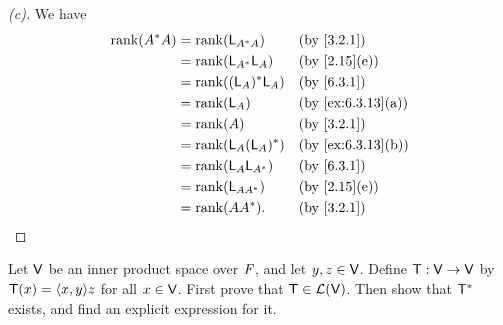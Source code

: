 \begin{proof}[(c)]
  We have
  \begin{align*}
    \rk{A^* A} & = \rk{\L_{A^* A}}    &  & \text{(by \cref{3.2.1})}        \\
               & = \rk{\L_{A^*} \L_A} &  & \text{(by \cref{2.15}(e))}      \\
               & = \rk{(\L_A)^* \L_A} &  & \text{(by \cref{6.3.1})}        \\
               & = \rk{\L_A}          &  & \text{(by \cref{ex:6.3.13}(a))} \\
               & = \rk{A}             &  & \text{(by \cref{3.2.1})}        \\
               & = \rk{\L_A (\L_A)^*} &  & \text{(by \cref{ex:6.3.13}(b))} \\
               & = \rk{\L_A \L_{A^*}} &  & \text{(by \cref{6.3.1})}        \\
               & = \rk{\L_{A A^*}}    &  & \text{(by \cref{2.15}(e))}      \\
               & = \rk{A A^*}.        &  & \text{(by \cref{3.2.1})}
  \end{align*}
\end{proof}

\begin{ex}\label{ex:6.3.14}
  Let \(\mathsf{V}\) be an inner product space over \(\mathit{F}\), and let \(y, z \in \mathsf{V}\).
  Define \(\mathsf{T} : \mathsf{V} \to \mathsf{V}\) by \(\T(x) = \inn{x, y} z\) for all \(x \in \mathsf{V}\).
  First prove that \(\mathsf{T} \in \mathcal{L}(\mathsf{V})\).
  Then show that \(\mathsf{T}^*\) exists, and find an explicit expression for it.
\end{ex}

